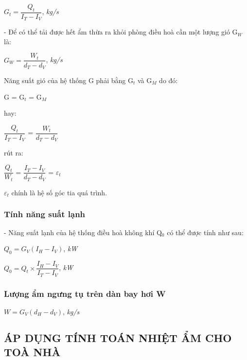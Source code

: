 \begin{center}
	$ G_{t} = \dfrac{Q_{t}}{I_{T} - I_{V}} $, \textit{kg/s}
\end{center}

- Để có thể tải được hết ẩm thừa ra khỏi phòng điều hoà cần một lượng gió G$_{W}$ là:

\begin{center}
	$ G_{W} = \dfrac{W_{t}}{d_{T} - d_{V}} $, \textit{kg/s}
\end{center}

Năng suất gió của hệ thống G phải bằng G$_{t}$ và G$_{M}$ do đó:

\begin{center}
	G = G$_{t}$ = G$_{M}$
\end{center}

hay:

\begin{center}
	$ \dfrac{Q_{t}}{I_{T} - I_{V}} $ = $\dfrac{W_{t}}{d_{T} - d_{V}} $
\end{center}

rút ra:

\begin{center}
	$ \dfrac{Q_{t}}{W_{t}} $ = $ \dfrac{I_{T} - I_{V}}{d_{T} - d_{V}} $ = {\Large $\varepsilon_{t}$}
\end{center}

{\Large $\varepsilon_{t}$} chính là hệ số góc tia quá trình.

\subsubsection{Tính năng suất lạnh}
- Năng suất lạnh của hệ thống điều hoà không khí Q$ _{0} $ có thể được tính như sau:

\begin{center}
	$Q _{0} = G_{V}(I_{H} - I_{V})$, \textit{kW}
\end{center}
\begin{center}
	$ Q _{0} = Q_{t}\times\dfrac{I_{H} - I_{V}}{I_{T} - I_{V}}$, \textit{kW}
\end{center}

\subsubsection{Lượng ẩm ngưng tụ trên dàn bay hơi W}
\begin{center}
	$W = G_{V}(d_{H}-d_{V})$, \textit{kg/s}
\end{center}

\subsection{ÁP DỤNG TÍNH TOÁN NHIỆT ẨM CHO TOÀ NHÀ}
